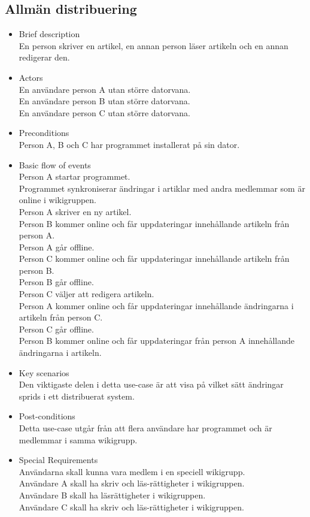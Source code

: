 \subsection{Allmän distribuering}
\begin{itemize}
	\item Brief description
	\\En person skriver en artikel, en annan person läser artikeln och en annan redigerar den.
	\item Actors
	\\En användare person A utan större datorvana.
	\\En användare person B utan större datorvana.
	\\En användare person C utan större datorvana.
	\item Preconditions
	\\Person A, B och C har programmet installerat på sin dator.
	\item Basic flow of events
	\\Person A startar programmet.
	\\Programmet synkroniserar ändringar i artiklar med andra medlemmar som är online i wikigruppen.
	\\Person A skriver en ny artikel.
	\\Person B kommer online och får uppdateringar innehållande artikeln från person A.
	\\Person A går offline.
	\\Person C kommer online och får uppdateringar innehållande artikeln från person B.
	\\Person B går offline.
	\\Person C väljer att redigera artikeln.
	\\Person A kommer online och får uppdateringar innehållande ändringarna i artikeln från person C.
	\\Person C går offline.
	\\Person B kommer online och får uppdateringar från person A innehållande ändringarna i artikeln.
	\item Key scenarios
	\\Den viktigaste delen i detta use-case är att visa på vilket sätt ändringar sprids i ett distribuerat system.
	\item Post-conditions
	\\Detta use-case utgår från att flera användare har programmet och är medlemmar i samma wikigrupp.
	\item Special Requirements
	\\Användarna skall kunna vara medlem i en speciell wikigrupp.
	\\Användare A skall ha skriv och läs-rättigheter i wikigruppen.
	\\Användare B skall ha läsrättigheter i wikigruppen.
	\\Användare C skall ha skriv och läs-rättigheter i wikigruppen.
\end{itemize}


